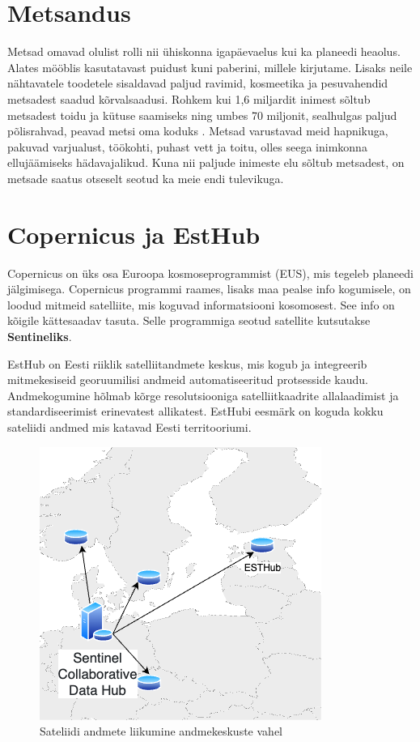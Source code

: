 \section{Metsandus}
Metsad omavad olulist rolli nii ühiskonna igapäevaelus kui ka planeedi heaolus.
Alates mööblis kasutatavast puidust kuni paberini, millele kirjutame. Lisaks neile
nähtavatele toodetele sisaldavad paljud ravimid, kosmeetika ja pesuvahendid
metsadest saadud kõrvalsaadusi. Rohkem kui 1,6 miljardit inimest sõltub
metsadest toidu ja kütuse saamiseks ning umbes 70 miljonit, sealhulgas paljud
põlisrahvad, peavad metsi oma koduks \cite{karsentyUnderlyingCausesRapid2003}. 
Metsad varustavad meid hapnikuga, pakuvad
varjualust, töökohti, puhast vett ja toitu, olles seega inimkonna ellujäämiseks
hädavajalikud. Kuna nii paljude inimeste elu sõltub metsadest, on metsade saatus
otseselt seotud ka meie endi tulevikuga. \cite{WWFImportanceForests} 

\section{Copernicus ja EstHub}
Copernicus on üks osa Euroopa kosmoseprogrammist (EUS), mis tegeleb planeedi jälgimisega. Copernicus programmi raames, lisaks maa pealse info kogumisele, on loodud mitmeid satelliite, mis koguvad informatsiooni kosomosest. See info on kõigile kättesaadav tasuta. Selle programmiga seotud satellite kutsutakse \textbf{Sentineliks}. \cite{CopernicusCopernicus}


EstHub on Eesti riiklik satelliitandmete keskus, mis kogub ja integreerib
mitmekesiseid georuumilisi andmeid automatiseeritud protsesside kaudu.
Andmekogumine hõlmab kõrge resolutsiooniga satelliitkaadrite allalaadimist ja
standardiseerimist erinevatest allikatest. EstHubi eesmärk on koguda kokku sateliidi andmed mis katavad Eesti territooriumi. \cite{maa-ametNationalSatelliteData}

\begin{figure}[H]
    \centering
    \includegraphics[width=.3\textwidth]{figures/datahubEU.drawio.png}
    \caption{Sateliidi andmete liikumine andmekeskuste vahel}
    \label{fig:esthubliiklus}
\end{figure}


